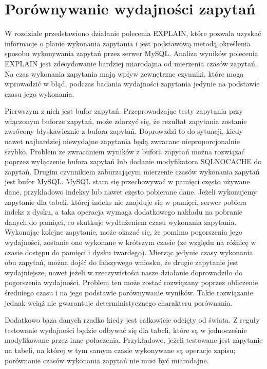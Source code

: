 \section{Porównywanie wydajności zapytań}
W rozdziale przedstawiono działanie polecenia EXPLAIN, które pozwala uzyskać informacje o planie wykonania zapytania i jest podstawową metodą określenia sposobu wykonywania zapytań przez serwer MySQL. Analiza wyników polecenia EXPLAIN jest zdecydowanie bardziej miarodajna od mierzenia czasów zapytań. Na czas wykonania zapytania mają wpływ zewnętrzne czynniki, które mogą wprowadzić w błąd, podczas badania wydajności zapytania jedynie na podstawie czasu jego wykonania. 

Pierwszym z nich jest bufor zapytań. Przeprowadzając testy zapytania przy włączonym buforze zapytań, może zdarzyć się, że rezultat zapytania zostanie zwrócony błyskawicznie z bufora zapytań. Doprowadzi to do sytuacji, kiedy nawet najbardziej niewydajne zapytania będą zwracane nieproporcjonalnie szybko. Problem ze zwracaniem wyników z bufora zapytań można rozwiązać poprzez wyłączenie bufora zapytań lub dodanie modyfikatora SQL\textunderscore NO\textunderscore CACHE do zapytań. 
Drugim czynnikiem zaburzającym mierzenie czasów wykonania zapytań jest bufor MySQL. MySQL stara się przechowywać w pamięci często używane dane, przykładowo indeksy lub nawet często pobierane dane. Jeżeli wykonujemy zapytanie dla tabeli, której indeks nie znajduje się w pamięci, serwer pobiera indeks z dysku, a taka operacja wymaga dodatkowego nakładu na pobranie danych do pamięci, co skutkuje wydłużeniem czasu wykonania zapytania. Wykonując kolejne zapytanie, może okazać się, że pomimo pogorszenia jego wydajności, zostanie ono wykonane w krótszym czasie (ze względu na różnicę w czasie dostępu do pamięci i dysku twardego). Mierząc jedynie czasy wykonania obu zapytań, można dojść do fałszywego wniosku, że drugie zapytanie jest wydajniejsze, nawet jeżeli w rzeczywistości nasze działanie doprowadziło do pogorszenia wydajności. Problem ten może zostać rozwiązany poprzez obliczenie średniego czasu i na jego podstawie porównywanie wyników. Takie rozwiązanie jednak wciąż nie gwarantuje deterministycznego charakteru porównania.

Dodatkowo baza danych rzadko kiedy jest całkowicie odcięty od świata. Z reguły testowanie wydajności będzie odbywać się dla tabeli, które są w jednocześnie modyfikowane przez inne połaczenia. Przykładowo, jeżeli testowane jest zapytanie na tabeli, na której w tym samym czasie wykonywane są operacje zapisu; porównanie czasów wykonania zapytań nie musi być miarodajne.

